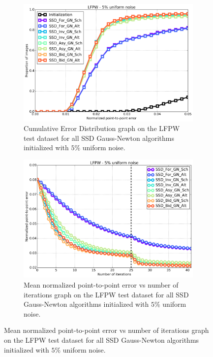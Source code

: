 \begin{figure}[h!]
	\centering
	\begin{subfigure}{0.48\textwidth}
	    \includegraphics[width=\textwidth]{experiments/algorithms/ssd_gn/ced_ssd_gn_5.png}
	    \caption{Cumulative Error Distribution graph on the LFPW test dataset for all SSD Gauss-Newton algorithms initialized with $5\%$ uniform noise.}
	    \label{fig:ced_ssd_gn_5}
	\end{subfigure}
	\hfill
	\begin{subfigure}{0.48\textwidth}
	    \includegraphics[width=\textwidth]{experiments/algorithms/ssd_gn/mean_error_vs_iters_ssd_gn_5.png}
	    \caption{Mean normalized point-to-point error vs number of iterations graph on the LFPW test dataset for all SSD Gauss-Newton algorithms initialized with $5\%$ uniform noise.}
	    \label{fig:mean_error_vs_iters_ssd_gn_5}

\end{subfigure}
\end{figure}
